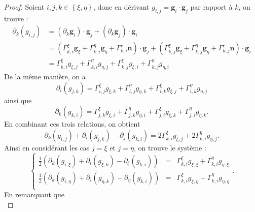 \begin{proof}
Soient $i,j, k  \in \left\lbrace \xi, \eta \right\rbrace$, donc en dérivant $g_{i,j} = \mathbf{g}_i \cdot \mathbf{g}_j$ par rapport à $k$, on trouve :
\begin{align*}
\partial_k (g_{i,j}) & = (\partial_k \mathbf{g}_i ) \cdot \mathbf{g}_j + (\partial_k \mathbf{g}_j ) \cdot \mathbf{g}_i\\
	& = \left( \Gamma_{k,i}^{\xi} \mathbf{g}_{\xi} + \Gamma_{k,i}^{\eta} \mathbf{g}_{\eta} + \Gamma_{k,i}^{r} \textbf{n} \right) \cdot \mathbf{g}_j + \left( \Gamma_{k,j}^{\xi} \mathbf{g}_{\xi} + \Gamma_{k,j}^{\eta} \mathbf{g}_{\eta} + \Gamma_{k,j}^{r} \textbf{n} \right) \cdot \mathbf{g}_i \\
	& = \Gamma_{k,i}^{\xi} g_{\xi,j} + \Gamma_{k,i}^{\eta} g_{\eta,j} + \Gamma_{k,j}^{\xi} g_{\xi,i} + \Gamma_{k,j}^{\eta} g_{\eta,i} 
\end{align*}
De la même manière, on a 
\begin{equation}
\partial_i (g_{j,k}) = \Gamma_{i,j}^{\xi} g_{\xi,k} + \Gamma_{i,j}^{\eta} g_{\eta,k} + \Gamma_{i,k}^{\xi} g_{\xi,j} + \Gamma_{i,k}^{\eta} g_{\eta,j}
\end{equation}
ainsi que
\begin{equation}
\partial_k (g_{k,i}) = \Gamma_{j,k}^{\xi} g_{\xi,i} + \Gamma_{j,k}^{\eta} g_{\eta,i} + \Gamma_{j,i}^{\xi} g_{\xi,k} + \Gamma_{j,i}^{\eta} g_{\eta,k}.
\end{equation}
En combinant ces trois relations, on obtient
\begin{equation}
\partial_k (g_{i,j}) + \partial_i (g_{j,k}) - \partial_j (g_{k,i}) = 2 \Gamma_{k,i}^{\xi} g_{\xi,j} + 2 \Gamma_{k,i}^{\eta} g_{\eta,j}.
\end{equation}
Ainsi en considérant les cas $j=\xi$ et $j=\eta$, on trouve le système :
\begin{equation}
\left\lbrace
\begin{array}{rcl}
\frac{1}{2} \left( \partial_k (g_{i,\xi}) + \partial_i (g_{\xi,k}) - \partial_{\xi} (g_{k,i}) \right) & = & \Gamma_{k,i}^{\xi} g_{\xi,\xi} + \Gamma_{k,i}^{\eta} g_{\eta,\xi} \\
\frac{1}{2} \left( \partial_k (g_{i,\eta}) + \partial_i (g_{\eta,k}) - \partial_{\eta} (g_{k,i}) \right) & = & \Gamma_{k,i}^{\xi} g_{\xi,\eta} + \Gamma_{k,i}^{\eta} g_{\eta,\eta} \\
\end{array}
\right. .
\end{equation}
En remarquant que
\begin{equation}

\end{equation}
\end{proof}
